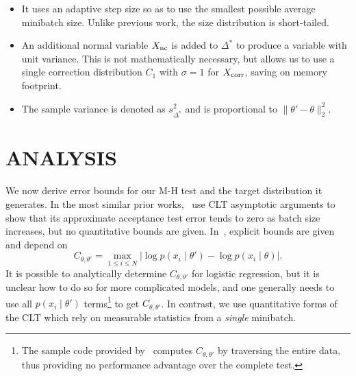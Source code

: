 \documentclass{article}
\begin{document}
\begin{itemize}[noitemsep]
    \item It uses an adaptive step size so as to use the smallest possible
    average minibatch size. Unlike previous work, the size distribution is
    short-tailed.

    \item An additional normal variable $X_{\rm nc}$ is added to $\Delta^*$ to
    produce a variable with unit variance. This is not mathematically necessary,
    but allows us to use a single correction distribution $C_1$ with $\sigma=1$
    for $X_{\rm corr}$, saving on memory footprint.

    \item The sample variance is denoted as $s^2_{\Delta^*}$ and is proportional
    to $\|\theta'-\theta\|_2^2$.
    
\end{itemize}



\section{ANALYSIS}\label{sec:analysis}

We now derive error bounds for our M-H test and the target distribution it
generates. In the most similar prior works,~\cite{cutting_mh_2014} use CLT
asymptotic arguments to show that its approximate acceptance test error tends to
zero as batch size increases, but no quantitative bounds are given.
In~\cite{icml2014c1_bardenet14}, explicit bounds are given and depend on
\begin{equation}\label{eq:bad_bound}
    C_{\theta, \theta'} = \max_{1\leq i\leq N}|\log p(x_i\mid\theta') - \log p(x_i\mid\theta)|.
\end{equation}
It is possible to analytically determine $C_{\theta,\theta'}$ for logistic
regression, but it is unclear how to do so for more complicated models, and one
generally needs to use all $p(x_i\mid \theta')$ terms\footnote{The sample code
provided by~\cite{icml2014c1_bardenet14} computes $C_{\theta,\theta'}$
by traversing the entire data, thus providing no performance advantage over the
complete test.} to get $C_{\theta,\theta'}$.  In contrast, we use quantitative
forms of the CLT which rely on measurable statistics from a \emph{single}
minibatch.
\end{document}
